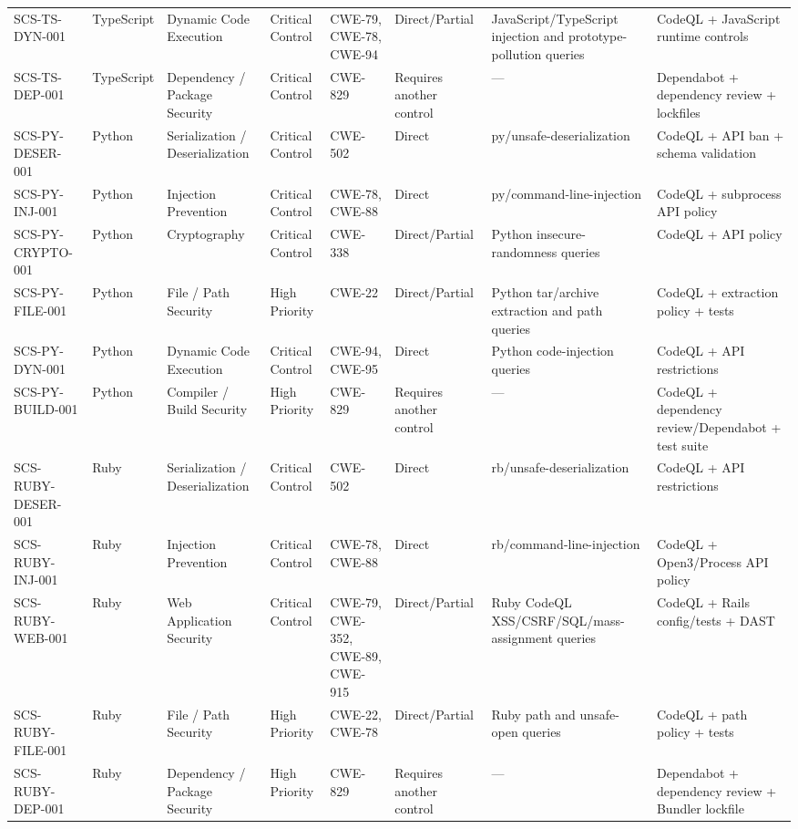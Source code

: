 \documentclass[10pt,letterpaper]{article}
\begin{document}
\begin{landscape}
\begin{longtable}{@{}P{1.0in}P{0.6in}P{0.95in}P{0.75in}P{0.85in}P{0.75in}P{2.0in}P{2.05in}@{}}
SCS-TS-DYN-001 & TypeScript & Dynamic Code Execution & Critical Control & CWE-79, CWE-78, CWE-94 & Direct/Partial & JavaScript/TypeScript injection and prototype-pollution queries & CodeQL + JavaScript runtime controls\\
SCS-TS-DEP-001 & TypeScript & Dependency / Package Security & Critical Control & CWE-829 & Requires another control & --- & Dependabot + dependency review + lockfiles\\
SCS-PY-DESER-001 & Python & Serialization / Deserialization & Critical Control & CWE-502 & Direct & py/unsafe-deserialization & CodeQL + API ban + schema validation\\
SCS-PY-INJ-001 & Python & Injection Prevention & Critical Control & CWE-78, CWE-88 & Direct & py/command-line-injection & CodeQL + subprocess API policy\\
SCS-PY-CRYPTO-001 & Python & Cryptography & Critical Control & CWE-338 & Direct/Partial & Python insecure-randomness queries & CodeQL + API policy\\
SCS-PY-FILE-001 & Python & File / Path Security & High Priority & CWE-22 & Direct/Partial & Python tar/archive extraction and path queries & CodeQL + extraction policy + tests\\
SCS-PY-DYN-001 & Python & Dynamic Code Execution & Critical Control & CWE-94, CWE-95 & Direct & Python code-injection queries & CodeQL + API restrictions\\
SCS-PY-BUILD-001 & Python & Compiler / Build Security & High Priority & CWE-829 & Requires another control & --- & CodeQL + dependency review/Dependabot + test suite\\
SCS-RUBY-DESER-001 & Ruby & Serialization / Deserialization & Critical Control & CWE-502 & Direct & rb/unsafe-deserialization & CodeQL + API restrictions\\
SCS-RUBY-INJ-001 & Ruby & Injection Prevention & Critical Control & CWE-78, CWE-88 & Direct & rb/command-line-injection & CodeQL + Open3/Process API policy\\
SCS-RUBY-WEB-001 & Ruby & Web Application Security & Critical Control & CWE-79, CWE-352, CWE-89, CWE-915 & Direct/Partial & Ruby CodeQL XSS/CSRF/SQL/mass-assignment queries & CodeQL + Rails config/tests + DAST\\
SCS-RUBY-FILE-001 & Ruby & File / Path Security & High Priority & CWE-22, CWE-78 & Direct/Partial & Ruby path and unsafe-open queries & CodeQL + path policy + tests\\
SCS-RUBY-DEP-001 & Ruby & Dependency / Package Security & High Priority & CWE-829 & Requires another control & --- & Dependabot + dependency review + Bundler lockfile\\

\end{longtable}
\end{landscape}
\end{document}
